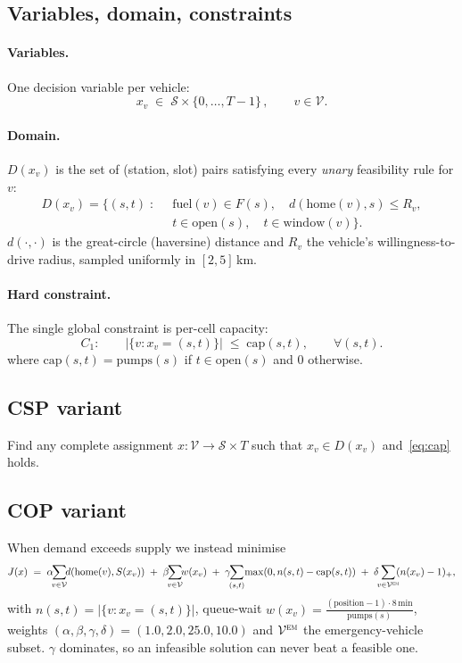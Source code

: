 \documentclass[11pt,a4paper]{article}
\begin{document}
\subsection{Variables, domain, constraints}
\paragraph{Variables.}
One decision variable per vehicle:
\[
  x_v \;\in\; \mathcal{S}\times\{0,\dots,T-1\}\,,\qquad v\in\mathcal{V}.
\]

\paragraph{Domain.}
$D(x_v)$ is the set of (station, slot) pairs satisfying every \emph{unary}
feasibility rule for $v$:
\begin{equation}
\label{eq:dom}
\begin{aligned}
  D(x_v) = \Big\{(s,t) \;:\;\;
    & \mathrm{fuel}(v)\in F(s),\quad
      d(\mathrm{home}(v),s)\le R_v,\\[-2pt]
    & t\in\mathrm{open}(s),\quad t\in\mathrm{window}(v)\Big\}.
\end{aligned}
\end{equation}
$d(\cdot,\cdot)$ is the great-circle (haversine) distance and $R_v$ the
vehicle's willingness-to-drive radius, sampled uniformly in $[2,5]$\,km.

\paragraph{Hard constraint.}
The single global constraint is per-cell capacity:
\begin{equation}
\label{eq:cap}
  C_1:\qquad
  \big|\{v:x_v=(s,t)\}\big|\;\le\;\mathrm{cap}(s,t),
  \qquad\forall (s,t).
\end{equation}
where $\mathrm{cap}(s,t)=\mathrm{pumps}(s)$ if $t\in\mathrm{open}(s)$ and $0$
otherwise.

\subsection{CSP variant}
Find any complete assignment $x:\mathcal{V}\to\mathcal{S}\times T$ such that
$x_v\in D(x_v)$ and~\eqref{eq:cap} holds.

\subsection{COP variant}
When demand exceeds supply we instead minimise
\begin{equation}
\label{eq:cop}
  J(x) \;=\;
    \alpha\!\!\sum_{v\in\mathcal{V}}\!\!d(\mathrm{home}(v),S(x_v))
   \;+\;
    \beta\!\!\sum_{v\in\mathcal{V}}\!\!w(x_v)
   \;+\;
    \gamma\!\!\sum_{(s,t)}\!\max(0,n(s,t)-\mathrm{cap}(s,t))
   \;+\;
    \delta\!\!\sum_{v\in\mathcal{V}^{\textsc{em}}}\!\!(n(x_v)-1)_+,
\end{equation}
with $n(s,t)=|\{v:x_v=(s,t)\}|$, queue-wait
$w(x_v)=\frac{(\mathrm{position}-1)\cdot 8\,\mathrm{min}}{\mathrm{pumps}(s)}$,
weights $(\alpha,\beta,\gamma,\delta)=(1.0,2.0,25.0,10.0)$ and
$\mathcal{V}^{\textsc{em}}$ the emergency-vehicle subset. $\gamma$ dominates,
so an infeasible solution can never beat a feasible one.
\end{document}
